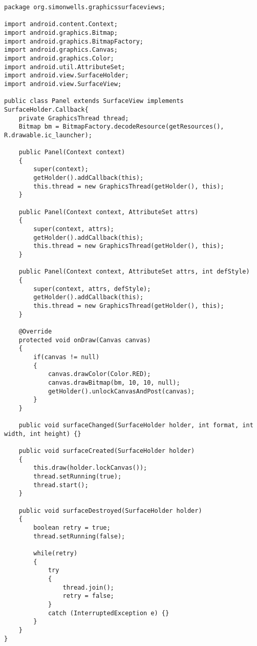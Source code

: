 \begin{lstlisting}
package org.simonwells.graphicssurfaceviews;

import android.content.Context;
import android.graphics.Bitmap;
import android.graphics.BitmapFactory;
import android.graphics.Canvas;
import android.graphics.Color;
import android.util.AttributeSet;
import android.view.SurfaceHolder;
import android.view.SurfaceView;

public class Panel extends SurfaceView implements SurfaceHolder.Callback{
    private GraphicsThread thread;
    Bitmap bm = BitmapFactory.decodeResource(getResources(), R.drawable.ic_launcher);

    public Panel(Context context)
    {
        super(context);
        getHolder().addCallback(this);
        this.thread = new GraphicsThread(getHolder(), this);
    }

    public Panel(Context context, AttributeSet attrs)
    {
        super(context, attrs);
        getHolder().addCallback(this);
        this.thread = new GraphicsThread(getHolder(), this);
    }

    public Panel(Context context, AttributeSet attrs, int defStyle)
    {
        super(context, attrs, defStyle);
        getHolder().addCallback(this);
        this.thread = new GraphicsThread(getHolder(), this);
    }

    @Override
    protected void onDraw(Canvas canvas)
    {
        if(canvas != null)
        {
            canvas.drawColor(Color.RED);
            canvas.drawBitmap(bm, 10, 10, null);
            getHolder().unlockCanvasAndPost(canvas);
        }
    }

    public void surfaceChanged(SurfaceHolder holder, int format, int width, int height) {}

    public void surfaceCreated(SurfaceHolder holder)
    {
        this.draw(holder.lockCanvas());
        thread.setRunning(true);
        thread.start();
    }

    public void surfaceDestroyed(SurfaceHolder holder)
    {
        boolean retry = true;
        thread.setRunning(false);

        while(retry)
        {
            try
            {
                thread.join();
                retry = false;
            }
            catch (InterruptedException e) {}
        }
    }
}
\end{lstlisting}

